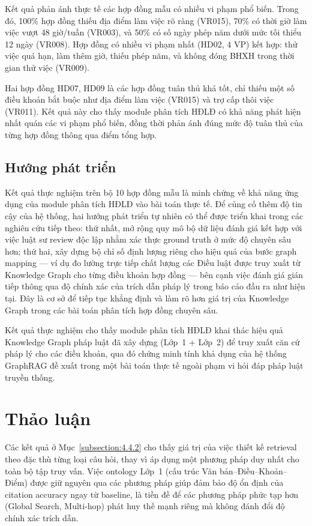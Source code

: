 \documentclass[../DoAn.tex]{subfiles}
\begin{document}
Kết quả phản ánh thực tế các hợp đồng mẫu có nhiều vi phạm phổ biến. Trong đó, 100\% hợp đồng thiếu địa điểm làm việc rõ ràng (VR015), 70\% có thời giờ làm việc vượt 48 giờ/tuần (VR003), và 50\% có số ngày phép năm dưới mức tối thiểu 12 ngày (VR008). Hợp đồng có nhiều vi phạm nhất (HD02, 4 VP) kết hợp: thử việc quá hạn, làm thêm giờ, thiếu phép năm, và không đóng BHXH trong thời gian thử việc (VR009).

Hai hợp đồng HD07, HD09 là các hợp đồng tuân thủ khá tốt, chỉ thiếu một số điều khoản bắt buộc như địa điểm làm việc (VR015) và trợ cấp thôi việc (VR011). Kết quả này cho thấy module phân tích HĐLĐ có khả năng phát hiện nhất quán các vi phạm phổ biến, đồng thời phản ánh đúng mức độ tuân thủ của từng hợp đồng thông qua điểm tổng hợp.

\subsection*{Hướng phát triển}
Kết quả thực nghiệm trên bộ 10 hợp đồng mẫu là minh chứng về khả năng ứng dụng của module phân tích HĐLĐ vào bài toán thực tế. Để củng cố thêm độ tin cậy của hệ thống, hai hướng phát triển tự nhiên có thể được triển khai trong các nghiên cứu tiếp theo: thứ nhất, mở rộng quy mô bộ dữ liệu đánh giá kết hợp với việc luật sư review độc lập nhằm xác thực ground truth ở mức độ chuyên sâu hơn; thứ hai, xây dựng bộ chỉ số định lượng riêng cho hiệu quả của bước graph mapping --- ví dụ đo lường trực tiếp chất lượng các Điều luật được truy xuất từ Knowledge Graph cho từng điều khoản hợp đồng --- bên cạnh việc đánh giá gián tiếp thông qua độ chính xác của trích dẫn pháp lý trong báo cáo đầu ra như hiện tại. Đây là cơ sở để tiếp tục khẳng định và làm rõ hơn giá trị của Knowledge Graph trong các bài toán phân tích hợp đồng chuyên sâu.

Kết quả thực nghiệm cho thấy module phân tích HĐLĐ khai thác hiệu quả Knowledge Graph pháp luật đã xây dựng (Lớp~1 + Lớp~2) để truy xuất căn cứ pháp lý cho các điều khoản, qua đó chứng minh tính khả dụng của hệ thống GraphRAG đề xuất trong một bài toán thực tế ngoài phạm vi hỏi đáp pháp luật truyền thống.

\section{Thảo luận}
\label{section:4.5}

Các kết quả ở Mục~\ref{subsection:4.4.2} cho thấy giá trị của việc thiết kế retrieval theo đặc thù từng loại câu hỏi, thay vì áp dụng một phương pháp duy nhất cho toàn bộ tập truy vấn. Việc ontology Lớp~1 (cấu trúc Văn bản--Điều--Khoản--Điểm) được giữ nguyên qua các phương pháp giúp đảm bảo độ ổn định của citation accuracy ngay từ baseline, là tiền đề để các phương pháp phức tạp hơn (Global Search, Multi-hop) phát huy thế mạnh riêng mà không đánh đổi độ chính xác trích dẫn.
\end{document}
